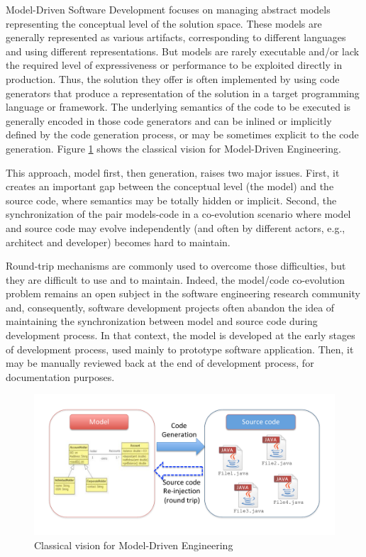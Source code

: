 

Model-Driven Software Development focuses on managing abstract models representing the conceptual level of the solution space. These models are generally represented as various artifacts, corresponding to different languages and using different representations. But models are rarely executable and/or lack the required level of expressiveness or performance to be exploited directly in production. Thus, the solution they offer is often implemented by using code generators that produce a representation of the solution in a target programming language or framework\cite{stahl2006model}. The underlying semantics of the code to be executed is generally encoded in those code generators and can be inlined or implicitly defined by the code generation process, or may be sometimes explicit to the code generation. Figure \ref{fig:ClassicalVision} shows the classical vision for Model-Driven Engineering.

This approach, model first, then generation, raises two major issues. First, it creates an important gap between the conceptual level (the model) and the source code, where semantics may be totally hidden or implicit. Second, the synchronization of the pair models-code in a co-evolution scenario where model and source code may evolve independently (and often by different actors, e.g., architect and developer) becomes hard to maintain.

Round-trip mechanisms are commonly used to overcome those difficulties, but they are difficult to use and to maintain. Indeed, the model/code co-evolution problem remains an open subject in the software engineering research community and, consequently, software development projects often abandon the idea of maintaining the synchronization between model and source code during development process. In that context, the model is developed at the early stages of development process, used mainly to prototype software application. Then, it may be manually reviewed back at the end of development process, for documentation purposes.

\begin{figure}
    \centering
    \includegraphics[width=1.0\columnwidth]{ClassicalVision.pdf}
    \caption{Classical vision for Model-Driven Engineering}
    \label{fig:ClassicalVision}
\end{figure}

